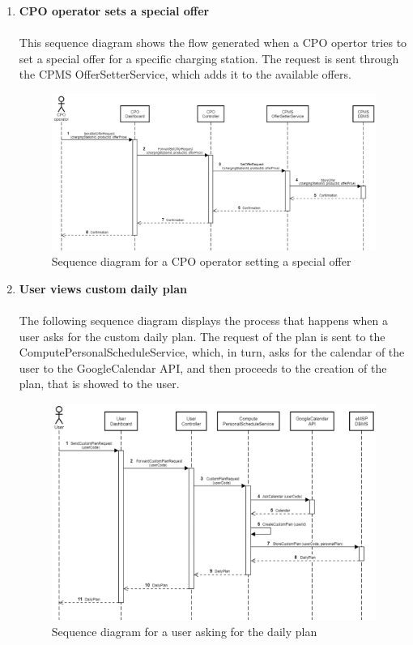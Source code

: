 \documentclass[12pt]{report}
\begin{document}
\begin{enumerate}[1.]
\newpage

    \item\textbf{CPO operator sets a special offer}\\
    \\
    This sequence diagram shows the flow generated when a CPO opertor tries to set a special offer for a specific charging station. The request is sent through the CPMS OfferSetterService, which adds it to the available offers.
    \\

     \begin{figure}[ht]
    \centering
    \includegraphics[width=\textwidth]{assets/sequencediagramOffer.png}
    \caption{Sequence diagram for a CPO operator setting a special offer}
    \label{fig:my_labelwerwer}
    \end{figure}
    
\newpage

    \item\textbf{User views custom daily plan}\\
    \\
    The following sequence diagram displays the process that happens when a user asks for the custom daily plan. The request of the plan is sent to the ComputePersonalScheduleService, which, in turn, asks for the calendar of the user to the GoogleCalendar API, and then proceeds to the creation of the plan, that is showed to the user.\\


    \begin{figure}[ht]
    \centering
    \includegraphics[width=\textwidth]{assets/sequencediagramPlan.png}
    \caption{Sequence diagram for a user asking for the daily plan}
    \label{fig:my_label6}
    \end{figure}



\end{enumerate}
\end{document}
